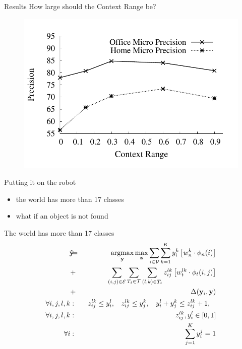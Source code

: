 \documentclass{beamer}
\DeclareMathOperator*{\argmax}{argmax}
\newcommand{\y}{{\mathbf y}}     %
\newcommand{\ysc}[2]{{y_{#1}^{#2}}}    %
\newcommand{\zsc}[2]{{z_{#1}^{#2}}}    %
\newcommand{\fn}[1]{{\phi_n(#1)}}      %
\newcommand{\fe}[3]{{\phi_{#1}(#2,#3)}}%
\newcommand{\wn}[1]{{w_n^{#1}}}        %
\newcommand{\we}[3]{{w_{#1}^{#2#3}}}   %
\newcommand{\loss}[2]{{\Delta(#1,#2)}}   %
\begin{document}
\begin{frame}{Results}
How large should the Context Range be?
  \begin{figure}
	\includegraphics[scale=0.5]{radiusEffectPlot.pdf} 
  \end{figure}
\end{frame}

\begin{frame}{Putting it on the robot}

\begin{itemize}
\item the world has more than 17 classes
\item what if an object is not found
\end{itemize}

\end{frame}

\begin{frame}{The world has more than 17 classes}
 \begin{eqnarray*}
\hat{\y}\!\!\!&=&\!\!\!\argmax_{\y}\max_{\mathbf z} \sum_{i \in \mathcal{V}} \sum_{k=1}^{K} \ysc{i}{k} \left[\wn{k} \cdot \fn{i} \right] \\
&+&  \!\!\!\sum_{(i,j)\in \mathcal{E}}  \sum_{T_t \in {\cal T}} \sum_{(l,k)\in T_t} \zsc{ij}{lk} \left[\we{t}{l}{k} \cdot \fe{t}{i}{j}\right] \\
&+& \loss{\y_i}{\y} \label{eq:relaxobj}\\
\forall i,j,l,k &:& \:\: \zsc{ij}{lk}\le \ysc{i}{l}, \:\:\:\:
\zsc{ij}{lk}\le \ysc{j}{k},\:\:\:\:
\ysc{i}{l} + \ysc{j}{k} \le \zsc{ij}{lk}+1,\:\:\:\: \\
\forall i,j,l,k &:& \zsc{ij}{lk},\ysc{i}{l} \in [ 0,1 ] \label{eq:relaxconst}\\
\forall i &:& \sum_{j=1}^{K} y_i^j = 1
\end{eqnarray*} 

\end{frame}
\end{document}
